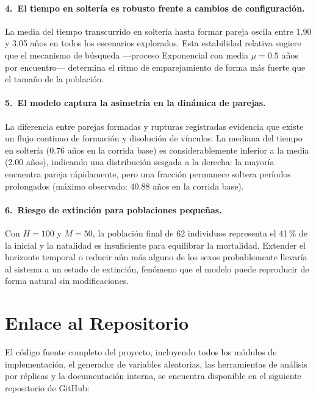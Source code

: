 \documentclass[12pt, a4paper]{article}
\begin{document}
\paragraph{4.~El tiempo en soltería es robusto frente a cambios de configuración.}
La media del tiempo transcurrido en soltería hasta formar pareja oscila
entre 1.90 y 3.05 años en todos los escenarios explorados. Esta estabilidad
relativa sugiere que el mecanismo de búsqueda —proceso Exponencial con media
$\mu = 0.5$ años por encuentro— determina el ritmo de emparejamiento de
forma más fuerte que el tamaño de la población.

\paragraph{5.~El modelo captura la asimetría en la dinámica de parejas.}
La diferencia entre parejas formadas y rupturas registradas evidencia que
existe un flujo continuo de formación y disolución de vínculos. La
mediana del tiempo en soltería (0.76 años en la corrida base) es
considerablemente inferior a la media (2.00 años), indicando una
distribución sesgada a la derecha: la mayoría encuentra pareja rápidamente,
pero una fracción permanece soltera períodos prolongados
(máximo observado: 40.88 años en la corrida base).

\paragraph{6.~Riesgo de extinción para poblaciones pequeñas.}
Con $H = 100$ y $M = 50$, la población final de 62 individuos representa
el 41\,\% de la inicial y la natalidad es insuficiente para equilibrar la
mortalidad. Extender el horizonte temporal o reducir aún más alguno de los
sexos probablemente llevaría al sistema a un estado de extinción, fenómeno
que el modelo puede reproducir de forma natural sin modificaciones.

\section{Enlace al Repositorio}

El código fuente completo del proyecto, incluyendo todos los módulos de
implementación, el generador de variables aleatorias, las herramientas de
análisis por réplicas y la documentación interna, se encuentra disponible
en el siguiente repositorio de GitHub:
\end{document}
